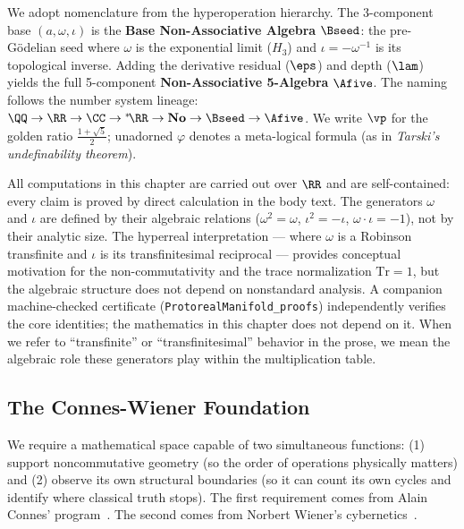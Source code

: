 \begin{remark}\label{rem:hyper-tower}
We adopt nomenclature from the hyperoperation hierarchy. The 3-component base $(a, \omega, \iota)$ is the \textbf{Base Non-Associative Algebra} $\Bseed$: the pre-G\"odelian seed where $\omega$ is the exponential limit ($H_3$) and $\iota = -\omega^{-1}$ is its topological inverse. Adding the derivative residual ($\eps$) and depth ($\lam$) yields the full 5-component \textbf{Non-Associative 5-Algebra} $\Afive$. The naming follows the number system lineage: $\QQ \to \RR \to \CC \to {}^*\!\RR \to \mathbf{No} \to \Bseed \to \Afive$. We write $\vp$ for the golden ratio $\tfrac{1+\sqrt{5}}{2}$; unadorned $\varphi$ denotes a meta-logical formula (as in \emph{Tarski's undefinability theorem}).
\end{remark}

\begin{remark}\label{rem:convention}
All computations in this chapter are carried out over $\RR$ and are
self-contained: every claim is proved by direct calculation in the body
text. The generators $\omega$ and $\iota$ are defined by their algebraic
relations ($\omega^2 = \omega$, $\iota^2 = -\iota$,
$\omega \cdot \iota = -1$), not by their analytic size. The hyperreal
interpretation --- where $\omega$ is a Robinson transfinite and $\iota$
is its transfinitesimal reciprocal --- provides conceptual motivation
for the non-commutativity and the trace normalization $\mathrm{Tr} = 1$,
but the algebraic structure does not depend on nonstandard analysis.
A companion machine-checked certificate
(\texttt{ProtorealManifold\_proofs}) independently verifies the
core identities; the mathematics in this chapter does not depend on it.
When we refer to ``transfinite'' or ``transfinitesimal'' behavior in the
prose, we mean the algebraic role these generators play within the
multiplication table.
\end{remark}

\subsection{The Connes-Wiener Foundation}\label{sec:connes-wiener}

We require a mathematical space capable of two simultaneous functions: (1) support noncommutative geometry (so the order of operations physically matters) and (2) observe its own structural boundaries (so it can count its own cycles and identify where classical truth stops). The first requirement comes from Alain Connes' program~\cite{connes}. The second comes from Norbert Wiener's cybernetics~\cite{wiener}.

